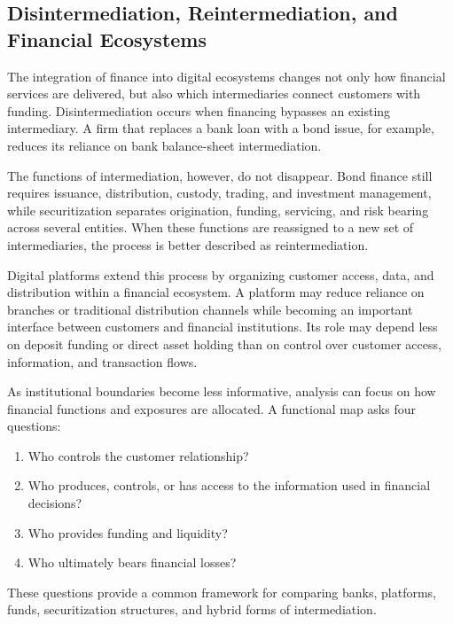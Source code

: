 \subsection[Disintermediation, Reintermediation, and Financial Ecosystems]{Disintermediation, Reintermediation, and Financial Ecosystems}

The integration of finance into digital ecosystems changes not only how financial services are delivered, but also which intermediaries connect customers with funding. Disintermediation occurs when financing bypasses an existing intermediary. A firm that replaces a bank loan with a bond issue, for example, reduces its reliance on bank balance-sheet intermediation.

The functions of intermediation, however, do not disappear. Bond finance still requires issuance, distribution, custody, trading, and investment management, while securitization separates origination, funding, servicing, and risk bearing across several entities. When these functions are reassigned to a new set of intermediaries, the process is better described as reintermediation.

Digital platforms extend this process by organizing customer access, data, and distribution within a financial ecosystem. A platform may reduce reliance on branches or traditional distribution channels while becoming an important interface between customers and financial institutions. Its role may depend less on deposit funding or direct asset holding than on control over customer access, information, and transaction flows.

As institutional boundaries become less informative, analysis can focus on how financial functions and exposures are allocated. A functional map asks four questions:

\begin{enumerate}

\item Who controls the customer relationship?

\item Who produces, controls, or has access to the information used in financial decisions?

\item Who provides funding and liquidity?

\item Who ultimately bears financial losses?

\end{enumerate}

These questions provide a common framework for comparing banks, platforms, funds, securitization structures, and hybrid forms of intermediation.

